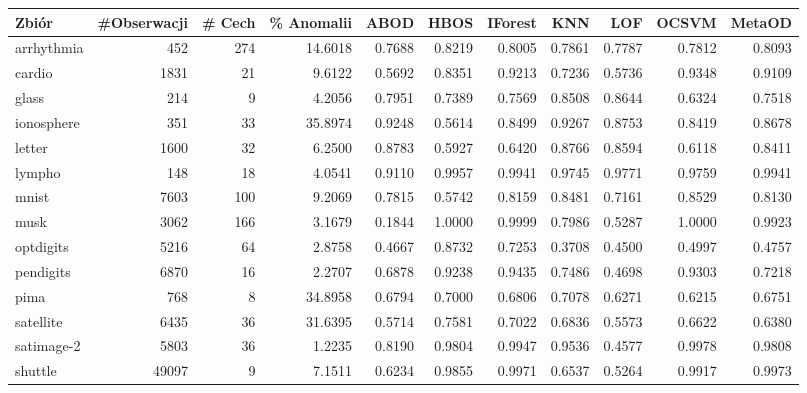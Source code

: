 \begin{sidewaystable}
    \centering
\begin{tabular}{lrrrrrrrrrr}
\toprule
      Zbiór &  \#Obserwacji &  \# Cech &  \% Anomalii &   ABOD &   HBOS &  IForest &    KNN &    LOF &  OCSVM &  MetaOD \\
\midrule
arrhythmia &       452 &           274 &       14.6018 & 0.7688 & 0.8219 &   0.8005 & 0.7861 & 0.7787 & 0.7812 &  0.8093 \\
    cardio &      1831 &            21 &        9.6122 & 0.5692 & 0.8351 &   0.9213 & 0.7236 & 0.5736 & 0.9348 &  0.9109 \\
     glass &       214 &             9 &        4.2056 & 0.7951 & 0.7389 &   0.7569 & 0.8508 & 0.8644 & 0.6324 &  0.7518 \\
ionosphere &       351 &            33 &       35.8974 & 0.9248 & 0.5614 &   0.8499 & 0.9267 & 0.8753 & 0.8419 &  0.8678 \\
    letter &      1600 &            32 &        6.2500 & 0.8783 & 0.5927 &   0.6420 & 0.8766 & 0.8594 & 0.6118 &  0.8411 \\
    lympho &       148 &            18 &        4.0541 & 0.9110 & 0.9957 &   0.9941 & 0.9745 & 0.9771 & 0.9759 &  0.9941 \\
     mnist &      7603 &           100 &        9.2069 & 0.7815 & 0.5742 &   0.8159 & 0.8481 & 0.7161 & 0.8529 &  0.8130 \\
      musk &      3062 &           166 &        3.1679 & 0.1844 & 1.0000 &   0.9999 & 0.7986 & 0.5287 & 1.0000 &  0.9923 \\
 optdigits &      5216 &            64 &        2.8758 & 0.4667 & 0.8732 &   0.7253 & 0.3708 & 0.4500 & 0.4997 &  0.4757 \\
 pendigits &      6870 &            16 &        2.2707 & 0.6878 & 0.9238 &   0.9435 & 0.7486 & 0.4698 & 0.9303 &  0.7218 \\
      pima &       768 &             8 &       34.8958 & 0.6794 & 0.7000 &   0.6806 & 0.7078 & 0.6271 & 0.6215 &  0.6751 \\
 satellite &      6435 &            36 &       31.6395 & 0.5714 & 0.7581 &   0.7022 & 0.6836 & 0.5573 & 0.6622 &  0.6380 \\
satimage-2 &      5803 &            36 &        1.2235 & 0.8190 & 0.9804 &   0.9947 & 0.9536 & 0.4577 & 0.9978 &  0.9808 \\
   shuttle &     49097 &             9 &        7.1511 & 0.6234 & 0.9855 &   0.9971 & 0.6537 & 0.5264 & 0.9917 &  0.9973 \\

\end{tabular}
\end{sidewaystable}
